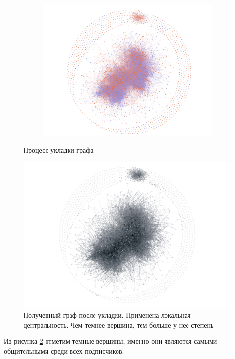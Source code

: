 \begin{figure}[H]
\begin{subfigure}[b]{0.3\textwidth}
        \includegraphics[width = \textwidth]{pictures/Layout_3.png}
    \end{subfigure}
    \caption{Процесс укладки графа}
    \label{fig:graph_layout}
\end{figure}

\begin{figure}[H]
    \centering
    \includegraphics[width = \textwidth]{pictures/Degree Centrality.pdf}
    \caption{Полученный граф после укладки. Применена локальная центральность. Чем темнее вершина, тем больше у неё степень}
    \label{fig:graph_deg}
\end{figure}

Из рисунка \ref{fig:graph_deg} отметим темные вершины, именно они являются самыми общительными среди всех подписчиков.

